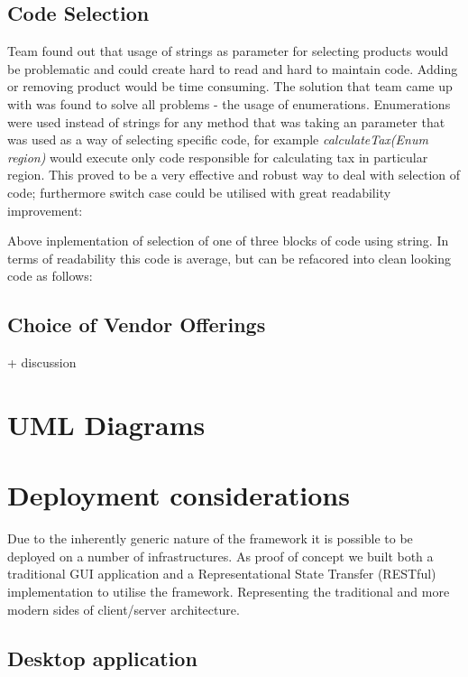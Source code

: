 \documentclass[pdftex,11pt,a4paper]{article}
\begin{document}
\subsection{Code Selection}
Team found out that usage of strings as parameter for selecting products would be problematic and could create hard to read and hard to maintain code. Adding or removing product would be time consuming. The solution that team came up with was found to solve all problems - the usage of enumerations. Enumerations were used instead of strings for any method that was taking an parameter that was used as a way of selecting specific code, for example \emph{calculateTax(Enum region)} would execute only code responsible for calculating tax in particular region. This proved to be a very effective and robust way to deal with selection of code; furthermore switch case could be utilised with great readability improvement:



Above inplementation of selection of one of three blocks of code using string. In terms of readability this code is average, but can be refacored into clean looking code as follows:



\subsection{Choice of Vendor Offerings}

+ discussion

\pagebreak

\section{UML Diagrams}

\pagebreak

\section{Deployment considerations}
Due to the inherently generic nature of the framework it is possible to be deployed on a number of infrastructures. As proof of concept we built both a traditional GUI application and a Representational State Transfer (RESTful)\cite{REST} implementation to utilise the framework. Representing the traditional and more modern sides of client/server architecture.

\subsection{Desktop application}
\end{document}
